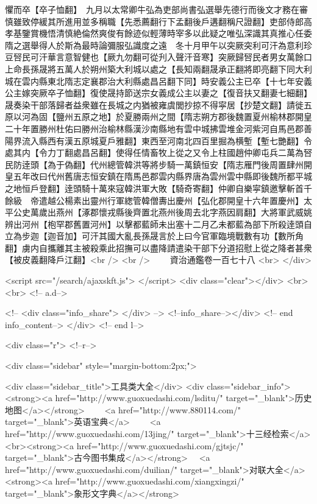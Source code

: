 懼而卒【卒子恤翻】　九月以太常卿牛弘為吏部尚書弘選舉先德行而後文才務在審慎雖致停緩其所進用並多稱職【先悉薦翻行下孟翻後戶遘翻稱尺證翻】吏部侍郎高孝基鑒賞機悟清慎絶倫然爽俊有餘迹似輕薄時宰多以此疑之唯弘深識其真推心任委隋之選舉得人於斯為最時論彌服弘識度之遠　冬十月甲午以突厥突利可汗為意利珍豆唘民可汗華言意智健也【厥九勿翻可從刋入聲汗音寒】突厥歸唘民者男女萬餘口上命長孫晟將五萬人於朔州築大利城以處之【長知兩翻晟承正翻將即亮翻下同大利城在雲内縣東北隋志定襄郡治大利縣處昌呂翻下同】時安義公主已卒【十七年安義公主嫁突厥卒子恤翻】復使晟持節送宗女義成公主以妻之【復音扶又翻妻七細翻】晟奏染干部落歸者益衆雖在長城之内猶被雍虞閭抄掠不得寜居【抄楚文翻】請徙五原以河為固【鹽州五原之地】於夏勝兩州之間【隋志朔方郡後魏置夏州榆林郡開皇二十年置勝州杜佑曰勝州治榆林縣漢沙南縣地有雲中城拂雲堆金河紫河自馬邑郡善陽界流入縣西有漢五原城夏戶雅翻】東西至河南北四百里掘為横塹【塹七艷翻】令處其内【令力丁翻處昌呂翻】使得任情畜牧上從之又令上柱國趙仲卿屯兵二萬為唘民防逹頭【為于偽翻】代州總管韓洪等將步騎一萬鎮恒安【隋志雁門後周置肆州開皇五年改曰代州舊唐志恒安鎮在隋馬邑郡雲内縣界唐為雲州雲中縣即後魏所都平城之地恒戶登翻】逹頭騎十萬來寇韓洪軍大敗【騎奇寄翻】仲卿自樂寜鎮邀擊斬首千餘級　帝遣越公楊素出靈州行軍緫管韓僧夀出慶州【弘化郡開皇十六年置慶州】太平公史萬歲出燕州【涿郡懷戎縣後齊置北燕州後周去北字燕因肩翻】大將軍武威姚辨出河州【枹罕郡舊置河州】以擊都藍師未出塞十二月乙未都藍為部下所殺逹頭自立為步迦【迦音加】可汗其國大亂長孫晟言於上曰今官軍臨境戰數有功【數所角翻】虜内自攜離其主被殺乘此招撫可以盡降請遣染干部下分道招慰上從之降者甚衆【被皮義翻降戶江翻】<br />
<br />
　　資治通鑑卷一百七十八  <br>
   </div> 

<script src="/search/ajaxskft.js"> </script>
 <div class="clear"></div>
<br>
<br>
 <!-- a.d-->

 <!--
<div class="info_share">
</div> 
-->
 <!--info_share--></div>   <!-- end info_content-->
  </div> <!-- end l-->

<div class="r">   <!--r-->



<div class="sidebar"  style="margin-bottom:2px;">

 
<div class="sidebar_title">工具类大全</div>
<div class="sidebar_info">
<strong><a href="http://www.guoxuedashi.com/lsditu/" target="_blank">历史地图</a></strong>　　
<a href="http://www.880114.com/" target="_blank">英语宝典</a>　　
<a href="http://www.guoxuedashi.com/13jing/" target="_blank">十三经检索</a>　
<br><strong><a href="http://www.guoxuedashi.com/gjtsjc/" target="_blank">古今图书集成</a></strong>　
<a href="http://www.guoxuedashi.com/duilian/" target="_blank">对联大全</a>　<strong><a href="http://www.guoxuedashi.com/xiangxingzi/" target="_blank">象形文字典</a></strong>　

